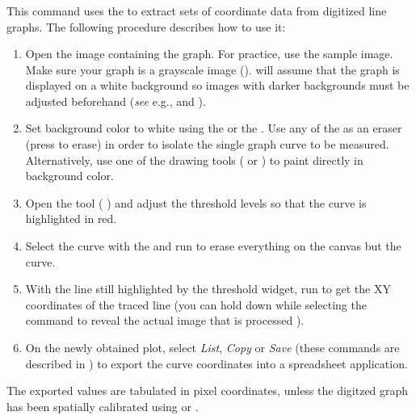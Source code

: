 

\subsubsection{\protect{}\label{sub:Analyze-Line-Graph}}

This command uses the  to extract sets
of coordinate data from digitized line graphs.
The following procedure describes how to use it:
\begin{enumerate}
\item Open the image containing the graph. For practice, use the sample
image. Make sure your graph is a grayscale image ().
 will assume that the graph is
displayed on a white background so images with darker backgrounds
must be adjusted beforehand (\emph{see} e.g., 
and ).
\item Set background color to white using the 
or the . Use any of the 
as an eraser (press  to erase) in order to
isolate the single graph curve to be measured. Alternatively, use
one of the drawing tools ( or )
to paint directly in background color.
\item Open the  tool (
) and adjust the threshold levels so that the curve
is highlighted in red.
\item Select the curve with the  and run 
to erase everything on the canvas but the curve.
\item With the line still highlighted by the threshold widget, run 
to get the XY coordinates of the traced line (you can hold down 
while selecting the command to reveal the actual image that is processed
).
\item On the newly obtained plot, select \emph{List}, \emph{Copy} or \emph{Save}
(these commands are described in )
to export the curve coordinates into a spreadsheet application.
\end{enumerate}
The exported values are tabulated in pixel coordinates, unless the
digitzed graph has been spatially calibrated using 
or .


